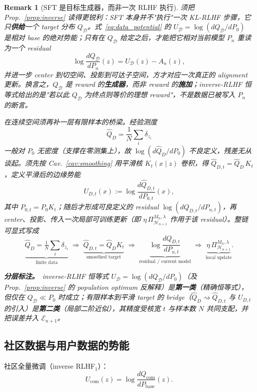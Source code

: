 \documentclass[11pt,a4paper]{article}
\newtheorem{remark}[theorem]{Remark}
\newcommand{\cD}{\mathcal{D}}
\newcommand{\cH}{\mathcal{H}}
\newcommand{\cE}{\mathcal{E}}
\newcommand{\ProjectOp}{\Pi}
\begin{document}
\begin{remark}[SFT 是目标生成器，而非一次 RLHF 执行]\label{rem:sft_target}
须把 Prop.~\ref{prop:inverse} 读得更锐利：SFT 本身并不"执行"一次 KL-RLHF 步骤，它只\textbf{供给}一个 target 分布 $Q_\cD$。式~\eqref{eq:data_potential} 的 $U_\cD=\log(dQ_\cD/dP_0)$ 是相对 base 的绝对势能；只有在 $Q_\cD$ 给定之后，才能把它相对\emph{当前}模型 $P_n$ 重读为一个 residual
\[
\log\frac{dQ_\cD}{dP_n}(z) = U_\cD(z) - A_n(z),
\]
并进一步 center 到切空间、投影到可达子空间，方才对应一次真正的 alignment 更新。换言之，$Q_\cD$ 是 reward 的\textbf{生成器}，而非 reward 的\textbf{施加}；inverse-RLHF 恒等式给出的是"若以此 $Q_\cD$ 为终点则等价的理想 reward"，不是数据已被写入 $P_n$ 的断言。

在连续空间须再补一层有限样本的桥梁。经验测度
\[
\widehat{Q}_D = \frac{1}{N}\sum_i \delta_{z_i}
\]
一般对 $P_0$ 无密度（支撑在零测集上），故 $\log(d\widehat{Q}_D/dP_0)$ 不良定义，残差无从谈起。须先按 Cav.~\ref{cav:smoothing} 用平滑核 $K_t(x\mid z)$ 卷积，得 $\widehat{Q}_{D,t}=\widehat{Q}_D\, K_t$，定义平滑后的边缘势能
\[
U_{D,t}(x) := \log\frac{d\widehat{Q}_{D,t}}{dP_{0,t}}(x),
\]
其中 $P_{0,t}=P_0 K_t$；随后才形成可良定义的 residual $\log(dQ_{D,t}/dP_{n,t})$，再 center、投影、传入一次\emph{局部}可训练更新（即 $\eta\,\ProjectOp^{M_n,\lambda}_{\cH_{n+1}}$ 作用于该 residual）。整链可显式写成
\[
\boxed{\;
\underbrace{\widehat{Q}_D=\tfrac1N\sum_i\delta_{z_i}}_{\text{finite data}}
\;\Rightarrow\;
\underbrace{\widehat{Q}_{D,t}=\widehat{Q}_D K_t}_{\text{smoothed target}}
\;\Rightarrow\;
\underbrace{\log\frac{dQ_{D,t}}{dP_{n,t}}}_{\text{residual / current model}}
\;\Rightarrow\;
\underbrace{\eta\,\ProjectOp^{M_n,\lambda}_{\cH_{n+1}}}_{\text{local update}}.
\;}
\]

\textbf{分层标注。}\ inverse-RLHF 恒等式 $U_\cD=\log(dQ_\cD/dP_0)$（及 Prop.~\ref{prop:inverse} 的 population optimum 反解释）是\textbf{第一类}（精确恒等式），但仅在 $Q_\cD\ll P_0$ 时成立；有限样本到平滑 target 的 bridge（$\widehat{Q}_D\rightsquigarrow\widehat{Q}_{D,t}$ 与 $U_{D,t}$ 的引入）是\textbf{第二类}（局部二阶近似），其精度受核宽 $t$ 与样本数 $N$ 共同支配，并把误差并入 $\cE_{n+1}$。
\end{remark}

\subsection{社区数据与用户数据的势能}

社区全量微调（inverse RLHF$_1$）：
\begin{equation}\label{eq:U_com}
U_{\text{com}}(z) = \log\frac{dQ_{\text{com}}}{dP_{\text{base}}}(z).
\end{equation}
\end{document}
